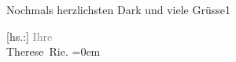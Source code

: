 \pstart
           Nochmals herzlichsten Dark und viele Grüsse1\pend
           
\pstart
           {[}hs.:{]} \textcolor{gray}{Ihre}{\\[\baselineskip]}\spacefill\mbox{Therese Rie.}\pend
           \leftskip=0em{}\endnumbering{}  \newcommand{\dateiname}{L02576}\newcommand{\titel}{Therese Rie-Andro an Arthur Schnitzler, 30. 9. 1923}\newcommand{\editorInnen}{Martin Anton Müller und Gerd-Hermann Susen}
